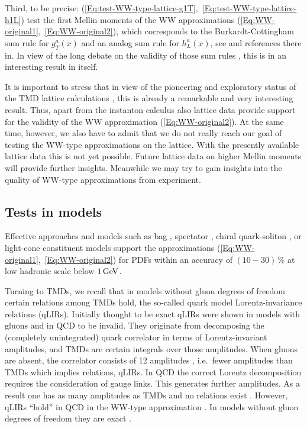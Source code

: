 \documentclass[a4paper,11pt]{article}
\begin{document}
Third, to be precise:
(\ref{Eq:test-WW-type-lattice-g1T},~\ref{Eq:test-WW-type-lattice-h1L})
test the first Mellin moments of the WW approximations
(\ref{Eq:WW-original1},~\ref{Eq:WW-original2}), which corresponds to the
Burkardt-Cottingham sum rule for $g_T^a(x)$ and an analog sum rule for
$h_L^a(x)$, see \cite{Jaffe:1996zw} and references there in.
In view of the long debate on the validity of those sum rules
\cite{Burkardt:2001iy,Bass:2003vp,Efremov:2002qh}, this is in
an interesting result in itself.

It is important to stress that in view of the pioneering and
exploratory status of the TMD lattice calculations
\cite{Hagler:2007xi}, this is already a remarkable and very
interesting result. Thus, apart from the instanton calculus
\cite{Dressler:1999hc} also lattice data provide support for
the validity of the WW approximation (\ref{Eq:WW-original2}).
At the same time, however, we also have to admit that we do
not really reach our goal of testing the WW-type approximations
on the lattice. With the presently available lattice data
this is not yet possible. Future lattice data on higher
Mellin moments will provide further insights.
Meanwhile we may try to gain insights into the quality of
WW-type approximations from experiment.

\subsection{Tests in models}
\label{Sec-3.6:models}

Effective approaches and models such as bag 
\cite{Jaffe:1991ra,Stratmann:1993aw,Signal:1996ct,Avakian:2010br},
spectator \cite{Jakob:1997wg}, chiral quark-soliton 
\cite{Wakamatsu:2000ex}, or light-cone 
constituent \cite{Pasquini:2008ax,Lorce:2011dv} models
support the approximations (\ref{Eq:WW-original1},~\ref{Eq:WW-original2}) 
for PDFs within an accuracy of $(10-30)\,\%$ at low hadronic scale 
below $1\,{\rm GeV}$. 

Turning to TMDs, we recall that in models without gluon 
degrees of freedom certain relations among TMDs hold, the 
so-called quark model Lorentz-invariance relations (qLIRs).
Initially thought to be exact \cite{Tangerman:1994bb,Mulders:1995dh}
qLIRs were shown in models with gluons \cite{Kundu:2001pk,Schlegel:2004rg} 
and in QCD \cite{Goeke:2003az} to be invalid.
They originate from decomposing the (completely unintegrated)
quark correlator in terms of Lorentz-invariant amplitudes, and 
TMDs are certain integrals over those amplitudes.
When gluons are absent, the correlator consists
of 12 amplitudes \cite{Tangerman:1994bb,Mulders:1995dh}, i.e.\ fewer 
amplitudes than TMDs which implies relations, qLIRs. 
In QCD the correct Lorentz decomposition requires the consideration of 
gauge links. This generates further amplitudes. As a result one has 
as many amplitudes as TMDs and no relations exist \cite{Goeke:2003az}. 
However, qLIRs ``hold'' in QCD in the WW-type approximation 
\cite{Metz:2008ib}. In models without gluon degrees of freedom 
they are exact
\cite{Metz:2008ib,Teckentrup:2009tk,Avakian:2010br,Jakob:1997wg}. 
\end{document}

